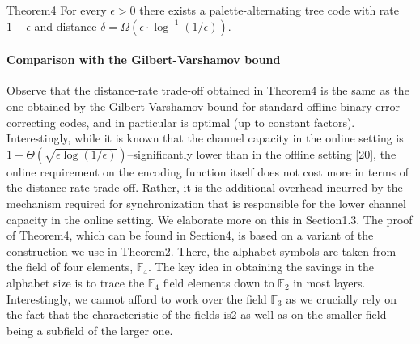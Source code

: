 \begin{authorclaim}{Theorem4}
For every $\epsilon>0$ there exists a palette-alternating tree code with rate $1-\epsilon$ and distance $\delta=\Omega(\epsilon\cdot\log^{-1}(1/\epsilon))$.
\end{authorclaim}
\paragraph{Comparison with the Gilbert-Varshamov bound}
Observe that the distance-rate trade-off obtained in Theorem4 is the same as the one obtained by the Gilbert-Varshamov bound for standard offline binary error correcting codes, and in particular is optimal (up to constant factors). Interestingly, while it is known that the channel capacity in the online setting is $1-\Theta(\sqrt{\epsilon\log(1/\epsilon)})$--significantly lower than in the offline setting [20], the online requirement on the encoding function itself does not cost more in terms of the distance-rate trade-off. Rather, it is the additional overhead incurred by the mechanism required for synchronization that is responsible for the lower channel capacity in the online setting. We elaborate more on this in Section1.3.
The proof of Theorem4, which can be found in Section4, is based on a variant of the construction we use in Theorem2. There, the alphabet symbols are taken from the field of four elements, $\mathbb F_4$. The key idea in obtaining the savings in the alphabet size is to trace the $\mathbb F_4$ field elements down to $\mathbb F_2$ in most layers. Interestingly, we cannot afford to work over the field $\mathbb F_3$ as we crucially rely on the fact that the characteristic of the fields is2 as well as on the smaller field being a subfield of the larger one.
